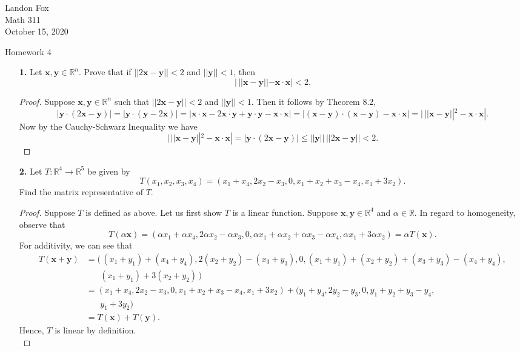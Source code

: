\documentclass[ 12pt ]{article}
\begin{document}
\noindent Landon Fox \\
\noindent Math 311 \\
\noindent October 15, 2020

\begin{center}
	\Large Homework 4
\end{center}

\begin{enumerate}
	\item[\textbf{1.}] Let $\textbf{x}, \textbf{y} \in \mathbb{R}^n$. Prove that if $||2\textbf{x} - \textbf{y}|| < 2$ and $||\textbf{y}|| < 1$, then $$|\, ||\textbf{x} - \textbf{y}|| -
		\textbf{x} \cdot \textbf{x}| < 2.$$

		\begin{proof}
			Suppose $\textbf{x}, \textbf{y} \in \mathbb{R}^n$ such that $||2\textbf{x} - \textbf{y}|| < 2$ and $||\textbf{y}|| < 1$. Then it follows by Theorem 8.2, $$| \textbf{y}
			\cdot (2\textbf{x} - \textbf{y}) | = | \textbf{y} \cdot (\textbf{y} - 2\textbf{x}) | = |\textbf{x} \cdot \textbf{x} - 2 \textbf{x} \cdot \textbf{y} + \textbf{y} \cdot
			\textbf{y} - \textbf{x} \cdot \textbf{x}| = |(\textbf{x} - \textbf{y}) \cdot (\textbf{x} - \textbf{y}) - \textbf{x} \cdot \textbf{x}| = |\, ||\textbf{x} - \textbf{y}||^2 -
			\textbf{x} \cdot \textbf{x} |.$$ Now by the Cauchy-Schwarz Inequality we have $$|\, ||\textbf{x} - \textbf{y}||^2 - \textbf{x} \cdot \textbf{x} | = | \textbf{y} \cdot
			(2\textbf{x} - \textbf{y}) | \leq ||\textbf{y}||\, ||2\textbf{x} - \textbf{y}|| < 2.$$
		\end{proof}


	\item[\textbf{2.}] Let $T: \mathbb{R}^4 \to \mathbb{R}^5$ be given by $$T(x_1, x_2, x_3, x_4) = (x_1 + x_4, 2x_2 - x_3, 0, x_1 + x_2 + x_3 - x_4, x_1 + 3x_2).$$ Find the matrix
		representative of $T$.

		\begin{proof}
			Suppose $T$ is defined as above. Let us first show $T$ is a linear function. Suppose $\textbf{x}, \textbf{y} \in \mathbb{R}^4$ and $\alpha \in \mathbb{R}$. In regard to
			homogeneity, observe that $$T(\alpha \textbf{x}) = (\alpha x_1 + \alpha x_4, 2\alpha x_2 - \alpha x_3, 0, \alpha x_1 + \alpha x_2 + \alpha x_3 - \alpha x_4, \alpha x_1 +
			3\alpha x_2) = \alpha T(\textbf{x}).$$ For additivity, we can see that
			\begin{align*}
				T(\textbf{x} + \textbf{y}) &= (\, (x_1 + y_1) + (x_4 + y_4), 2(x_2 + y_2) - (x_3 + y_3), 0, (x_1 + y_1) + (x_2 + y_2) + (x_3 + y_3) - (x_4 + y_4), \\
				&\;\;\;\;\;\;(x_1 + y_1) + 3(x_2 + y_2)\, ) \\
				&= (x_1 + x_4, 2x_2 - x_3, 0, x_1 + x_2 + x_3 - x_4, x_1 + 3x_2) + (y_1 + y_4, 2y_2 - y_3, 0, y_1 + y_2 + y_3 - y_4, \\
				&\;\;\;\;\;\;y_1 + 3y_2) \\
				&= T(\textbf{x}) + T(\textbf{y}).
			\end{align*}
			Hence, $T$ is linear by definition. \\


\end{proof}
\end{enumerate}
\end{document}
